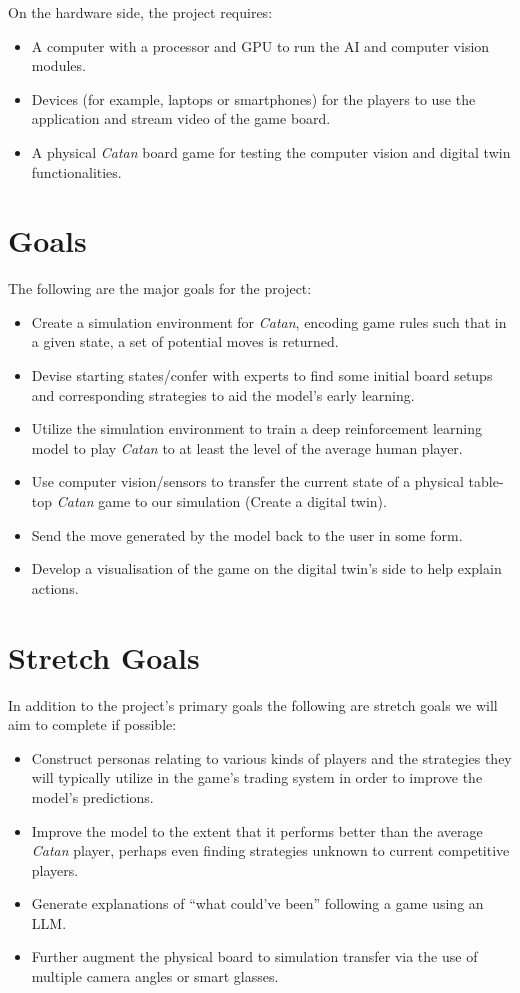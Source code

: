 \documentclass{article}
\begin{document}
On the hardware side, the project requires:
\begin{itemize}
    \item A computer with a processor and GPU to run the AI and computer vision modules.
    \item Devices (for example, laptops or smartphones) for the players to use the application and stream video of the game board.
    \item A physical \emph{Catan} board game for testing the computer vision and digital twin functionalities.
\end{itemize}

\section{Goals}\label{sec:goals}
The following are the major goals for the project:
\begin{itemize}
    \item Create a simulation environment for \emph{Catan}, encoding game rules such that in a given state, a set of potential moves is returned.
    \item Devise starting states/confer with experts to find some initial board setups and corresponding strategies to aid the model’s early learning.
    \item Utilize the simulation environment to train a deep reinforcement learning model to play \emph{Catan} to at least the level of the average human player.
    \item Use computer vision/sensors to transfer the current state of a physical table-top \emph{Catan} game to our simulation (Create a digital twin).
    \item Send the move generated by the model back to the user in some form.
    \item Develop a visualisation of the game on the digital twin’s side to help explain actions.
\end{itemize}

\section{Stretch Goals}\label{sec:stretch-goals}
In addition to the project’s primary goals the following are stretch goals we will aim to complete if possible:
\begin{itemize}
    \item Construct personas relating to various kinds of players and the strategies they will typically utilize in the game’s trading system in order to improve the model’s predictions.
    \item Improve the model to the extent that it performs better than the average \emph{Catan} player, perhaps even finding strategies unknown to current competitive players.
    \item Generate explanations of “what could’ve been” following a game using an LLM\@.
    \item Further augment the physical board to simulation transfer via the use of multiple camera angles or smart glasses.
\end{itemize}
\end{document}
